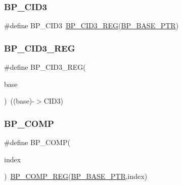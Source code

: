 \subsubsection{\texorpdfstring{B\+P\+\_\+\+C\+I\+D3}{BP\_CID3}}
{\footnotesize\ttfamily \#define B\+P\+\_\+\+C\+I\+D3~\hyperlink{group___b_p___register___accessor___macros_ga7801e128c54f36d727767e20b4729c21}{B\+P\+\_\+\+C\+I\+D3\+\_\+\+R\+EG}(\hyperlink{group___b_p___peripheral_ga375cd6d2e7ec414f4e33cb54d5494940}{B\+P\+\_\+\+B\+A\+S\+E\+\_\+\+P\+TR})}

\mbox{\label{group___b_p___register___accessor___macros_ga7801e128c54f36d727767e20b4729c21}} 
\subsubsection{\texorpdfstring{B\+P\+\_\+\+C\+I\+D3\+\_\+\+R\+EG}{BP\_CID3\_REG}}
{\footnotesize\ttfamily \#define B\+P\+\_\+\+C\+I\+D3\+\_\+\+R\+EG(\begin{DoxyParamCaption}\item[{}]{base }\end{DoxyParamCaption})~((base)-\/$>$C\+I\+D3)}

\mbox{\label{group___b_p___register___accessor___macros_gafc2b6b687efce75bcd85d343d0d74fbd}} 
\subsubsection{\texorpdfstring{B\+P\+\_\+\+C\+O\+MP}{BP\_COMP}}
{\footnotesize\ttfamily \#define B\+P\+\_\+\+C\+O\+MP(\begin{DoxyParamCaption}\item[{}]{index }\end{DoxyParamCaption})~\hyperlink{group___b_p___register___accessor___macros_gaa003734bc6b716d1723b103a68d560ba}{B\+P\+\_\+\+C\+O\+M\+P\+\_\+\+R\+EG}(\hyperlink{group___b_p___peripheral_ga375cd6d2e7ec414f4e33cb54d5494940}{B\+P\+\_\+\+B\+A\+S\+E\+\_\+\+P\+TR},index)}

